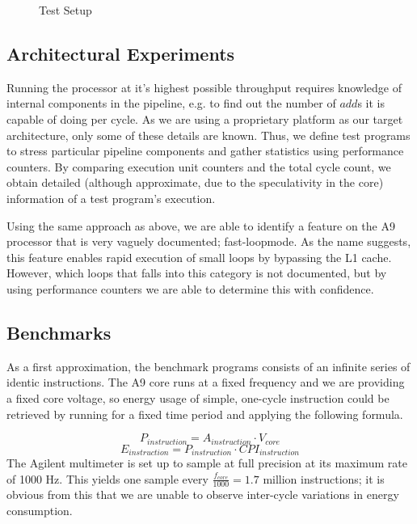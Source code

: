 \begin{figure}

\caption{Test Setup}
\label{fig:setup}
\end{figure}

\subsection{Architectural Experiments}
\label{arch_experiments}
Running the processor at it's highest possible throughput requires knowledge of
internal components in the pipeline, e.g. to find out the number of $add$s it is
capable of doing per cycle. As we are using a proprietary platform as our target
architecture, only some of these details are known. Thus, we define test
programs to stress particular pipeline components and gather statistics using
performance counters. By comparing execution unit counters and the total cycle
count, we obtain detailed (although approximate, due to the speculativity in the
core) information of a test program's execution.

Using the same approach as above, we are able to identify a feature on the A9
processor that is very vaguely documented; fast-loop\texttrademark mode. As the
name suggests, this feature enables rapid execution of small loops by bypassing
the L1 cache.  However, which loops that falls into this category is not
documented, but by using performance counters we are able to determine this with
confidence.


\subsection{Benchmarks}
As a first approximation, the benchmark programs consists of an infinite series
of identic instructions. The A9 core runs at a fixed frequency and we are
providing a fixed core voltage, so energy usage of simple, one-cycle instruction
could be retrieved by running for a fixed time period and applying the following
formula.

\begin{equation}
    P_{instruction} = A_{instruction} \cdot V_{core}
\end{equation}
\begin{equation}
    E_{instruction} = P_{instruction} \cdot CPI_{instruction}
\end{equation}
The Agilent multimeter is set up to sample at full precision at its maximum rate
of 1000 Hz. This yields one sample every $\frac{ f_{core} }{ 1000 } = 1.7$
million instructions; it is obvious from this that we are unable to observe
inter-cycle variations in energy consumption.

